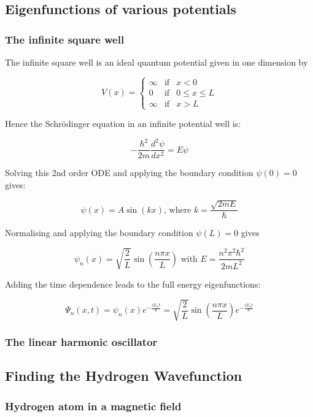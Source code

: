 \subsection{Eigenfunctions of various potentials}

\subsubsection{The infinite square well}

The infinite square well is an ideal quantum potential given in one dimension by

\[ V(x) = \left\{\begin{matrix}
\infty & \text{if} & x < 0 \\
0 & \text{if} & 0\leq x \leq L \\
\infty & \text{if} & x > L 
\end{matrix}\right. \]

Hence the Schr\"odinger equation in an infinite potential well is:

\[ -\frac{\hbar^2}{2m}\frac{d^2 \psi}{dx^2} = E\psi \]

Solving this 2nd order ODE and applying the boundary condition $\psi(0) = 0$ gives:

\[ \psi(x) = A\sin(kx)\text{, where } k = \frac{\sqrt{2mE}}{\hbar} \]

Normalising and applying the boundary condition $\psi(L) = 0$ gives

\[ \psi_n (x) = \sqrt{\frac{2}{L}}\sin(\frac{n\pi x}{L}) \text{ with } E = \frac{n^2 \pi^2 \hbar^2}{2m L^2} \]

Adding the time dependence leads to the full energy eigenfunctions:

\[ \Psi_n (x,t) = \psi_n (x) e^{-\frac{iE_n t}{\hbar}} = \sqrt{\frac{2}{L}}\sin(\frac{n\pi x}{L}) e^{-\frac{iE_n t}{\hbar}} \]




\subsubsection{The linear harmonic oscillator}

\subsection{Finding the Hydrogen Wavefunction}

\subsubsection*{Hydrogen atom in a magnetic field}